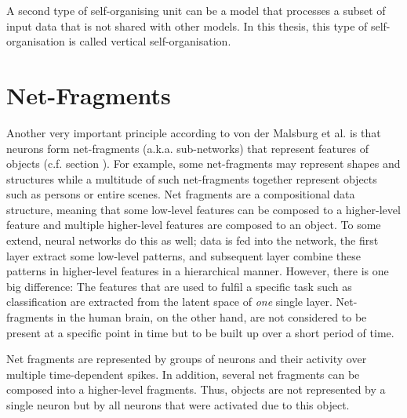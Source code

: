\begin{implementation}
	A second type of self-organising unit can be a model that processes a subset of input data that is not shared with other models. In this thesis, this type of self-organisation is called vertical self-organisation.
\end{implementation}


\section{Net-Fragments}
Another very important principle according to von der Malsburg et al. \cite{von_der_Malsburg_Stadelmann_Grewe_2022} is that neurons form net-fragments (a.k.a. sub-networks) that represent features of objects (c.f. section ).
For example, some net-fragments may represent shapes and structures while a multitude of such net-fragments together represent objects such as persons or entire scenes.
Net fragments are a compositional data structure, meaning that some low-level features can be composed to a higher-level feature and multiple higher-level features are composed to an object.
To some extend, neural networks do this as well; data is fed into the network, the first layer extract some low-level patterns, and subsequent layer combine these patterns in higher-level features in a hierarchical manner.
However, there is one big difference: The features that are used to fulfil a specific task such as classification are extracted from the latent space of \emph{one} single layer.
Net-fragments in the human brain, on the other hand, are not considered to be present at a specific point in time but to be built up over a short period of time.

\begin{claim}
	Net fragments are represented by groups of neurons and their activity over multiple time-dependent spikes. In addition, several net fragments can be composed into a higher-level fragments. Thus, objects are not represented by a single neuron but by all neurons that were activated due to this object.
\end{claim}

